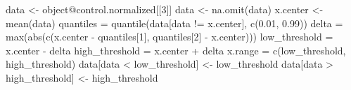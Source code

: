 \documentclass[]{article}
\newcommand{\hlnum}[1]{\textcolor[rgb]{0.816,0.125,0.439}{#1}}%
\newcommand{\hlstr}[1]{\textcolor[rgb]{0.251,0.627,0.251}{#1}}%
\newcommand{\hlstd}[1]{\textcolor[rgb]{0.251,0.251,0.251}{#1}}%
\newenvironment{Shaded}{\begin{myshaded}}{\end{myshaded}}
\newcommand{\DecValTok}[1]{\hlnum{#1}}
\newcommand{\FloatTok}[1]{\hlnum{#1}}
\newcommand{\SpecialCharTok}[1]{\hlstr{#1}}
\newcommand{\OtherTok}[1]{{#1}}
\newcommand{\FunctionTok}[1]{\hlstd{#1}}
\newcommand{\NormalTok}[1]{\hlstd{#1}}
\begin{document}
\begin{Shaded}
\begin{Highlighting}[]

\NormalTok{data }\OtherTok{\textless{}{-}}\NormalTok{ object}\SpecialCharTok{@}\NormalTok{control.normalized[[}\DecValTok{3}\NormalTok{]]}
\NormalTok{data }\OtherTok{\textless{}{-}} \FunctionTok{na.omit}\NormalTok{(data)}
\NormalTok{x.center }\OtherTok{\textless{}{-}} \FunctionTok{mean}\NormalTok{(data)}
\NormalTok{quantiles }\OtherTok{=} \FunctionTok{quantile}\NormalTok{(data[data }\SpecialCharTok{!=}\NormalTok{ x.center], }\FunctionTok{c}\NormalTok{(}\FloatTok{0.01}\NormalTok{, }\FloatTok{0.99}\NormalTok{))}
\NormalTok{delta }\OtherTok{=} \FunctionTok{max}\NormalTok{(}\FunctionTok{abs}\NormalTok{(}\FunctionTok{c}\NormalTok{(x.center }\SpecialCharTok{{-}}\NormalTok{ quantiles[}\DecValTok{1}\NormalTok{], quantiles[}\DecValTok{2}\NormalTok{] }\SpecialCharTok{{-}} 
\NormalTok{    x.center)))}
\NormalTok{low\_threshold }\OtherTok{=}\NormalTok{ x.center }\SpecialCharTok{{-}}\NormalTok{ delta}
\NormalTok{high\_threshold }\OtherTok{=}\NormalTok{ x.center }\SpecialCharTok{+}\NormalTok{ delta}
\NormalTok{x.range }\OtherTok{=} \FunctionTok{c}\NormalTok{(low\_threshold, high\_threshold)}
\NormalTok{data[data }\SpecialCharTok{\textless{}}\NormalTok{ low\_threshold] }\OtherTok{\textless{}{-}}\NormalTok{ low\_threshold}
\NormalTok{data[data }\SpecialCharTok{\textgreater{}}\NormalTok{ high\_threshold] }\OtherTok{\textless{}{-}}\NormalTok{ high\_threshold}


\end{Highlighting}
\end{Shaded}
\end{document}
